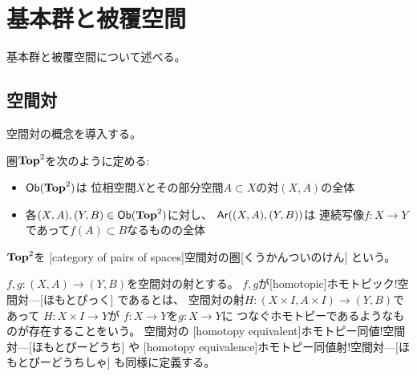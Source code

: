 \documentclass[report]{jlreq}
\begin{document}
%
\chapter{基本群と被覆空間}

基本群と被覆空間について述べる。

%
\section{空間対}

空間対の概念を導入する。

\begin{definition}[空間対]
    圏$\mathbf{Top}^2$を次のように定める:
    \begin{itemize}
        \item $\operatorname{\mathsf{Ob}}(\mathbf{Top}^2)$は
            位相空間$X$とその部分空間$A \subset X$の対$(X, A)$の全体
        \item 各$(X, A), (Y, B) \in \operatorname{\mathsf{Ob}}(\mathbf{Top}^2)$に対し、
            $\operatorname{\mathsf{Ar}}((X, A), (Y, B))$は
            連続写像$f \colon X \to Y$であって$f(A) \subset B$なるものの全体
    \end{itemize}
    $\mathbf{Top}^2$を
    [category of pairs of spaces]{空間対の圏}[くうかんついのけん]
    という。
\end{definition}

\begin{definition}[空間対のホモトピー]
    $f, g \colon (X, A) \to (Y, B)$を空間対の射とする。
    $f, g$が[homotopic]{ホモトピック!空間対---}[ほもとぴっく]
    であるとは、
    空間対の射$H \colon (X \times I, A \times I) \to (Y, B)$であって
    $H \colon X \times I \to Y$が
    $f \colon X \to Y$を$g \colon X \to Y$に
    つなぐホモトピーであるようなものが存在することをいう。
    空間対の
    [homotopy equivalent]{ホモトピー同値!空間対---}[ほもとぴーどうち]
    や
    [homotopy equivalence]{ホモトピー同値射!空間対---}[ほもとぴーどうちしゃ]
    も同様に定義する。
\end{definition}

%
\end{document}
